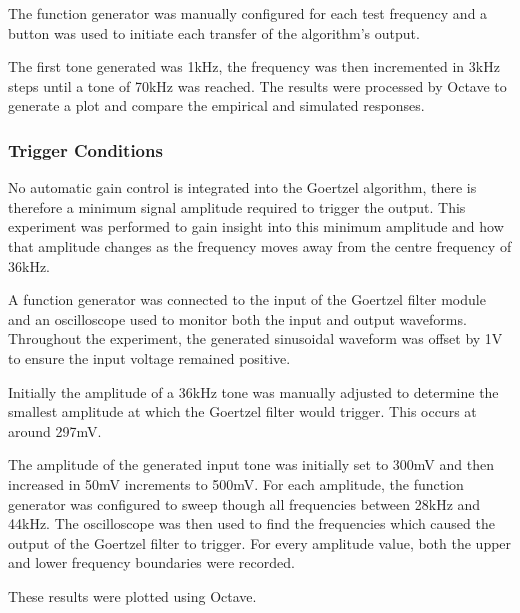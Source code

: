 The function generator was manually configured for each test frequency and a button was used to initiate each transfer of the algorithm's output.

The first tone generated was 1kHz, the frequency was then incremented in 3kHz steps until a tone of 70kHz was reached. The results were processed by Octave to generate a plot and compare the empirical and simulated responses.


\subsubsection{Trigger Conditions}

No automatic gain control is integrated into the Goertzel algorithm, there is therefore a minimum signal amplitude required to trigger the output. This experiment was performed to gain insight into this minimum amplitude and how that amplitude changes as the frequency moves away from the centre frequency of 36kHz.

A function generator was connected to the input of the Goertzel filter module and an oscilloscope used to monitor both the input and output waveforms. Throughout the experiment, the generated sinusoidal waveform was offset by 1V to ensure the input voltage remained positive.

Initially the amplitude of a 36kHz tone was manually adjusted to determine the smallest amplitude at which the Goertzel filter would trigger. This occurs at around 297mV.

The amplitude of the generated input tone was initially set to 300mV and then increased in  50mV increments to 500mV. For each amplitude, the function generator was configured to sweep though all frequencies between 28kHz and 44kHz. The oscilloscope was then used to find the frequencies which caused the output of the Goertzel filter to trigger. For every amplitude value, both the upper and lower frequency boundaries were recorded.

These results were plotted using Octave.












